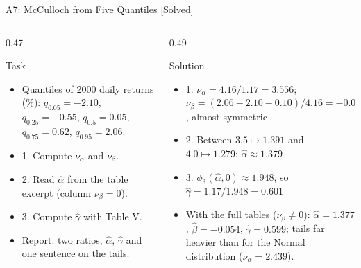 \begin{frame}{A7: McCulloch from Five Quantiles [Solved]}
\itemsize{\scriptsize}
\begin{columns}[T]
\begin{column}{0.47\textwidth}
\begin{block}{Task}
\begin{itemize}
    \item Quantiles of 2000 daily returns (\%): $q_{0.05} = -2.10$, $q_{0.25} = -0.55$, $q_{0.5} = 0.05$, $q_{0.75} = 0.62$, $q_{0.95} = 2.06$.
    \item 1. Compute $\nu_\alpha$ and $\nu_\beta$.
    \item 2. Read $\hat\alpha$ from the table excerpt (column $\nu_\beta = 0$).
    \item 3. Compute $\hat\gamma$ with Table V.
    \item Report: two ratios, $\hat\alpha$, $\hat\gamma$ and one sentence on the tails.
\end{itemize}
\end{block}
\end{column}
\begin{column}{0.49\textwidth}
\begin{exampleblock}{Solution}
\begin{itemize}
    \item 1. $\nu_\alpha = 4.16/1.17 = 3.556$; $\nu_\beta = (2.06 - 2.10 - 0.10)/4.16 = -0.034$, almost symmetric
    \item 2. Between $3.5 \mapsto 1.391$ and $4.0 \mapsto 1.279$: $\hat\alpha \approx 1.379$
    \item 3. $\phi_3(\hat\alpha, 0) \approx 1.948$, so $\hat\gamma = 1.17/1.948 = 0.601$
    \item With the full tables ($\nu_\beta \ne 0$): $\hat\alpha = 1.377$, $\hat\beta = -0.054$, $\hat\gamma = 0.599$; tails far heavier than for the Normal distribution ($\nu_\alpha = 2.439$).
\end{itemize}
\end{exampleblock}
\end{column}
\end{columns}
\end{frame}

